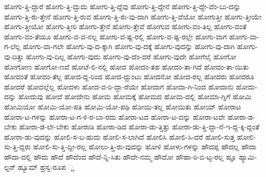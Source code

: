 {ಹೋಗು-ತ್ತಿ-ದ್ದಾರೆ
ಹೋಗು-ತ್ತಿ-ದ್ದುದು
ಹೋಗು-ತ್ತಿ-ದ್ದೆವು
ಹೋಗು-ತ್ತಿ-ದ್ದೇನೆ
ಹೋಗು-ತ್ತಿ-ದ್ದೇ-ವೆಂ-ಬು-ದನ್ನು
ಹೋಗು-ತ್ತಿ-ರು-ತ್ತೇನೆ
ಹೋಗು-ತ್ತಿ-ರುವ
ಹೋಗು-ತ್ತಿ-ರು-ವು-ದಾಗಿ
ಹೋಗು-ತ್ತಿ-ವೆಯೋ
ಹೋಗುತ್ತೀ
ಹೋಗು-ತ್ತೀಯೇ
ಹೋಗು-ತ್ತೀಯೋ
ಹೋಗು-ತ್ತೀರಿ
ಹೋಗು-ತ್ತೇನೆ
ಹೋಗು-ತ್ತೇವೆ
ಹೋಗುವ
ಹೋಗು-ವಂ-ತಿಲ್ಲ
ಹೋಗು-ವಂತೆ
ಹೋಗು-ವಂ-ತೆಯೂ
ಹೋಗು-ವ-ವ-ನಲ್ಲ
ಹೋಗು-ವ-ಷ್ಟ-ರಲ್ಲಿ
ಹೋಗು-ವ-ಷ್ಟ-ರಲ್ಲೇ
ಹೋಗು-ವಾಗ
ಹೋಗು-ವಾ-ಗ-ಲೆಲ್ಲ
ಹೋಗು-ವಾ-ಗಲೇ
ಹೋಗು-ವು-ದ-ಕ್ಕಾಗಿ
ಹೋಗು-ವು-ದಕ್ಕೆ
ಹೋಗು-ವುದನ್ನು
ಹೋಗು-ವು-ದಾಗಿ
ಹೋಗು-ವು-ದಿತ್ತು
ಹೋಗು-ವು-ದಿಲ್ಲ
ಹೋಗು-ವುದು
ಹೋಗು-ವು-ದೆಂ-ದರೆ
ಹೋಗು-ವುದೇ
ಹೋಗೆಲೈ
ಹೋಗೋ
ಹೋಗೋಣ
ಹೋಗೋ-ಣವೆ
ಹೋಟೆ-ಲಿ-ನಲ್ಲಿ
ಹೋದ
ಹೋದಂ-ತಹ
ಹೋದಂ-ತಾ-ಗಿದೆ
ಹೋದಂ-ತಾ-ಯಿತು
ಹೋದಂತೆ
ಹೋದಂ-ತೆಲ್ಲ
ಹೋದ-ದ್ದ-ರಿಂದ
ಹೋದ-ದ್ದುಂಟು
ಹೋದನೋ
ಹೋದ-ರಲ್ಲ
ಹೋದರು
ಹೋದರೂ
ಹೋದರೆ
ಹೋದಲ್ಲೆಲ್ಲ
ಹೋದಳು
ಹೋದ-ವ-ರಿ-ದ್ದಾ-ರೆಯೇ
ಹೋದಾಗ
ಹೋದಾ-ಗಿ-ನಿಂದ
ಹೋದಾನು
ಹೋದು-ದನ್ನು
ಹೋದುವು
ಹೋದೆ
ಹೋದೇನು
ಹೋಮ
ಹೋಮಕ್ಕೆ
ಹೋಮದ
ಹೋಮ-ದಲ್ಲಿ
ಹೋಮಾ-ಗ್ನಿಗೆ
ಹೋಮಿ
ಹೋಮಿಯೋ
ಹೋಮಿ-ಯೋ-ಪತಿ
ಹೋಮಿ-ಯೋ-ಪಥಿ
ಹೋಯಿ-ತಲ್ಲ
ಹೋಯಿತು
ಹೋಯ್
ಹೋರಾಟ
ಹೋರಾ-ಟ-ಗಳನ್ನು
ಹೋರಾ-ಟ-ಗ-ಳಿ-ರ-ಬಾ-ರದು
ಹೋರಾ-ಟದ
ಹೋರಾ-ಟ-ವನ್ನು
ಹೋರಾ-ಟವೇ
ಹೋರಾ-ಡ-ಬೇಕು
ಹೋರಾ-ಡ-ಲೇ-ಬೇಕು
ಹೋರಾಡಿ
ಹೋರಾ-ಡಿದ
ಹೋರಾ-ಡು-ತ್ತಿತ್ತು
ಹೋರಾ-ಡು-ತ್ತಿ-ದ್ದಾ-ನೆ-ಇ-ದ್ದ-ಕ್ಕಿ-ದ್ದಂತೆ
ಹೋರಾ-ಡು-ವುದನ್ನು
ಹೋಲಿ-ಸ-ಬ-ಹುದು
ಹೋಲಿ-ಸ-ಲಾಗಿದೆ
ಹೋಲಿಸಿ
ಹೋಲಿ-ಸಿ-ದರೆ
ಹೋಲಿ-ಸುತ್ತ
ಹೋಲಿ-ಸು-ತ್ತಿ-ದ್ದರು
ಹೋಲಿ-ಸು-ತ್ತಿ-ದ್ದೀ-ರಲ್ಲ
ಹೋಲು-ತ್ತಿ-ರು-ವುದನ್ನು
ಹೋಳಿ
ಹೋಳು-ಗಳನ್ನು
ಹೌದಪ್ಪ
ಹೌದಲ್ಲ
ಹೌದಾ
ಹೌದಾ-ದಲ್ಲಿ
ಹೌದು
ಹೌದೆ
ಹೌದೆಂದ
ಹೌದೆ-ನ್ನಿ-ಸಿತು
ಹೌದೇ-ನಮ್ಮ
ಹೌದೋ
ಹೌಹಾ-ರಿ-ಬಿ-ಟ್ಟ-ರಲ್ಲ
ಹ್ಞೂ
ಹ್ಯಾಮಿ-ಲ್ಟನ್
ಹ್ಯೂಮ್
ಹ್ರಸ್ವ-ರೂಪ
್ಣ
}
